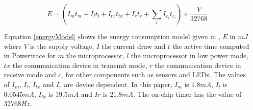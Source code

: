 \begin{equation}
E = (I_{m}t_{m} + I_{l}t_{l} + I_{tx}t_{tx} + I_{r}t_{r} +  \sum_{i}I_{c_{i}}t_{c_{i}}) \times\frac{V}{32768}
\label{energyModel}
\end{equation}

Equation \ref{energyModel} shows the energy consumption model given in \cite{dunkels2007software}, $E$ in $mJ$ where $V$ is the supply voltage, $I$ the current draw and $t$ the active time computed in Powertrace for $m$ the microprocessor, $l$ the microprocessor in low power mode, $tx$ the communication device in transmit mode, $r$ the communication device in receive mode and $c_{i}$ for other components such as sensors and LEDs. The values of $I_{m}$, $I_{l}$, $I_{tx}$ and $I_{r}$ are device dependent. In this paper, $I_{m}$ is $1.8 mA$, $I_{l}$ is $0.0545 mA$, $I_{tx}$ is $19.5 mA$ and $I{r}$ is $21.8 mA$. The on-chip timer has the value of $32768Hz$.




